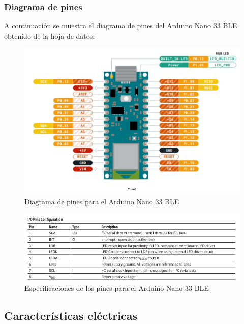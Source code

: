     \subsubsection{Diagrama de pines}

    A continuación se muestra el diagrama de pines del Arduino Nano 33 BLE obtenido de la hoja de datos: 

    \begin{figure}[H]
        \centering
        \includegraphics[width=0.8\linewidth]{pics/diagrama_pin.png}
        \caption{Diagrama de pines para el Arduino Nano 33 BLE}
        \label{fig:pin}
    \end{figure}

    \begin{figure}[H]
        \centering
        \includegraphics[width=0.8\linewidth]{pics/pines.png}
        \caption{Especificaciones de los pines para el Arduino Nano 33 BLE}
        \label{fig:pines}
    \end{figure}
    
    \subsection{Características eléctricas}
    
